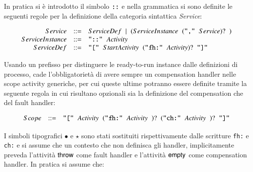 In pratica si è introdotto il simbolo $\verb#::#$ e nella grammatica si sono
definite le seguenti regole per la definizione della categoria sintattica
\emph{Service}:

$$
\begin{array}{rcl}
Service & ::= &  ServiceDef \hspace{0.2cm} | \hspace{0.2cm} ( ServiceInstance
\hspace{0.2cm}( \verb#","# \hspace{0.2cm} Service  )? \hspace{0.2cm} )  \\ 

ServiceInstance & ::= &  \verb#"::"# \hspace{0.2cm} Activity \\
 
ServiceDef & ::= & \verb#"["# \hspace{0.2cm} StartActivity \hspace{0.2cm} (
\verb#"fh:"# \hspace{0.2cm} Activity )? \hspace{0.2cm} \verb#"]"# \\

\end{array}
$$

Usando un prefisso per distinguere le ready-to-run instance dalle
definizioni di processo, cade l'obbligatorietà di avere sempre un compensation
handler nelle scope activity generiche, per cui queste ultime potranno essere
definite tramite la seguente regola in cui risultano opzionali sia la
definizione del compensation che del fault handler:

$$
\begin{array}{rcl}
Scope & ::= & \verb#"["# \hspace{0.2cm} Activity \hspace{0.2cm} (
\verb#"fh:"# \hspace{0.2cm} Activity \hspace{0.2cm})? \hspace{0.2cm}(
\verb#"ch:"# \hspace{0.2cm}Activity \hspace{0.2cm})?\hspace{0.2cm} \verb#"]"#
\end{array}
$$

I simboli tipografici $\bullet$ e $\star$ sono stati sostituiti rispettivamente
dalle scritture \verb#fh:# e \verb#ch:# e si assume che un contesto che non
definisca gli handler, implicitamente preveda l'attività ${\sf throw}$ come fault
handler e l'attività ${\sf empty}$ come compensation handler. In pratica si assume
che: \label{defHandelr}

